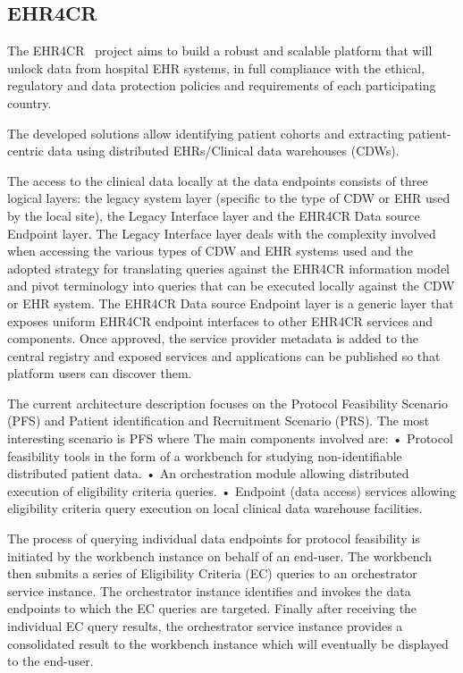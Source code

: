 \subsection*{EHR4CR}

The EHR4CR~\cite{ehr4cr} project aims to build a robust and scalable platform that will unlock data from hospital EHR systems, in full compliance with the ethical, regulatory and data protection policies and requirements of each participating country.

The developed solutions allow identifying patient cohorts and extracting patient-centric data using distributed EHRs/Clinical data warehouses (CDWs).

The access to the clinical data locally at the data endpoints consists of three logical layers: the legacy system layer (specific to the type of CDW or EHR used by the local site), the Legacy Interface layer and the EHR4CR Data source Endpoint layer.
The Legacy Interface layer deals with the complexity involved when accessing the various types of CDW and EHR systems used and the adopted strategy for translating queries against the EHR4CR information model and pivot terminology into queries that can be executed locally against the CDW or EHR system.
The EHR4CR Data source Endpoint layer is a generic layer that exposes uniform EHR4CR endpoint interfaces to other EHR4CR services and components.
Once approved, the service provider metadata is added to the central registry and exposed services and applications can be published so that platform users can discover them.

The current architecture description focuses on the Protocol Feasibility Scenario (PFS) and Patient identification and Recruitment Scenario (PRS).
The most interesting scenario is PFS where The main components involved are:
• Protocol feasibility tools in the form of a workbench for studying non-identifiable distributed patient data.
• An orchestration module allowing distributed execution of eligibility criteria queries.
• Endpoint (data access) services allowing eligibility criteria query execution on local clinical data warehouse facilities.

The process of querying individual data endpoints for protocol feasibility is initiated by the workbench instance on behalf of an end-user.
The workbench then submits a series of Eligibility Criteria (EC) queries to an orchestrator service instance.
The orchestrator instance identifies and invokes the data endpoints to which the EC queries are targeted.
Finally after receiving the individual EC query results, the orchestrator service instance provides a consolidated result to the workbench instance which will eventually be displayed to the end-user.

